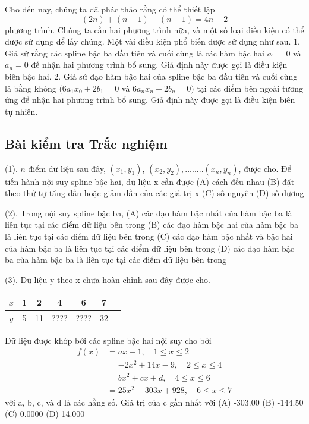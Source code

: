 Cho đến nay, chúng ta đã phác thảo rằng có thể thiết lập
\begin{equation}
(2n)+(n-1)+(n-1) = 4n-2
\end{equation}
phương trình. Chúng ta cần hai phương trình nữa, và một số loại điều kiện có thể được sử dụng để lấy chúng. Một vài điều kiện phổ biến được sử dụng như sau.
1. Giả sử rằng các spline bậc ba đầu tiên và cuối cùng là các hàm bậc hai $a_{1}=0$ và $a_{n}=0$ để nhận hai phương trình bổ sung. Giả định này được gọi là điều kiện biên bậc hai.
2. Giả sử đạo hàm bậc hai của spline bậc ba đầu tiên và cuối cùng là bằng không $(6a_{1}x_{0}+2b_{1}=0$ và $6a_{n}x_{n}+2b_{n}=0)$ tại các điểm bên ngoài tương ứng để nhận hai phương trình bổ sung. Giả định này được gọi là điều kiện biên tự nhiên.

\subsection{Bài kiểm tra Trắc nghiệm}

(1). $n$ điểm dữ liệu sau đây, $(x_{1},y_{1})$, $(x_{2},y_{2}),........(x_{n},y_{n})$, được cho. Để tiến hành nội suy spline bậc hai, dữ liệu x cần được
(A) cách đều nhau
(B) đặt theo thứ tự tăng dần hoặc giảm dần của các giá trị x
(C) số nguyên
(D) số dương

(2). Trong nội suy spline bậc ba,
(A) các đạo hàm bậc nhất của hàm bậc ba là liên tục tại các điểm dữ liệu bên trong
(B) các đạo hàm bậc hai của hàm bậc ba là liên tục tại các điểm dữ liệu bên trong
(C) các đạo hàm bậc nhất và bậc hai của hàm bậc ba là liên tục tại các điểm dữ liệu bên trong
(D) các đạo hàm bậc ba của hàm bậc ba là liên tục tại các điểm dữ liệu bên trong

(3). Dữ liệu y theo x chưa hoàn chỉnh sau đây được cho.
\begin{table}[h]
\centering
\begin{tabular}{|c|c|c|c|c|c|c|}
\hline
$x$ & 1 & 2 & 4 & 6 & 7 \\
\hline
$y$ & 5 & 11 & ???? & ???? & 32 \\
\hline
\end{tabular}
\end{table}

Dữ liệu được khớp bởi các spline bậc hai nội suy cho bởi
\begin{align}
f(x) &= ax-1, \quad 1 \le x \le 2 \nonumber \\
&= -2x^2+14x-9, \quad 2 \le x \le 4 \nonumber \\
&= bx^2+cx+d, \quad 4 \le x \le 6 \nonumber \\
&= 25x^2-303x+928, \quad 6 \le x \le 7
\end{align}
với a, b, c, và d là các hằng số. Giá trị của c gần nhất với
(A) -303.00
(B) -144.50
(C) 0.0000
(D) 14.000

